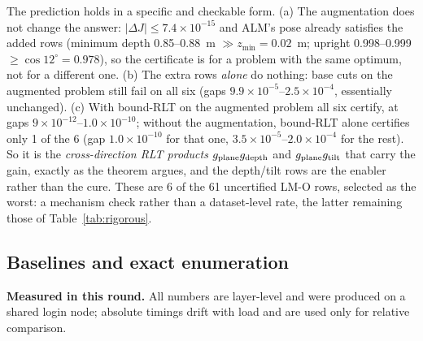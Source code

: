 The prediction holds in a specific and checkable form. (a) The augmentation does not change the answer: $|\Delta J|\le7.4\times10^{-15}$ and ALM's pose already satisfies the added rows (minimum depth 0.85--0.88~m $\gg z_{\min}=0.02$~m; upright 0.998--0.999 $\ge\cos12^\circ=0.978$), so the certificate is for a problem with the same optimum, not for a different one. (b) The extra rows \emph{alone} do nothing: base cuts on the augmented problem still fail on all six (gaps $9.9\times10^{-5}$--$2.5\times10^{-4}$, essentially unchanged). (c) With bound-RLT on the augmented problem all six certify, at gaps $9\times10^{-12}$--$1.0\times10^{-10}$; without the augmentation, bound-RLT alone certifies only 1 of the 6 (gap $1.0\times10^{-10}$ for that one, $3.5\times10^{-5}$--$2.0\times10^{-4}$ for the rest). So it is the \emph{cross-direction RLT products} $g_{\rm plane}g_{\rm depth}$ and $g_{\rm plane}g_{\rm tilt}$ that carry the gain, exactly as the theorem argues, and the depth/tilt rows are the enabler rather than the cure. These are 6 of the 61 uncertified LM-O rows, selected as the worst: a mechanism check rather than a dataset-level rate, the latter remaining those of Table~\ref{tab:rigorous}.

\subsection{Baselines and exact enumeration}\label{app:baselines}
\textbf{Measured in this round.} All numbers are layer-level and were produced on a shared login node; absolute timings drift with load and are used only for relative comparison.

